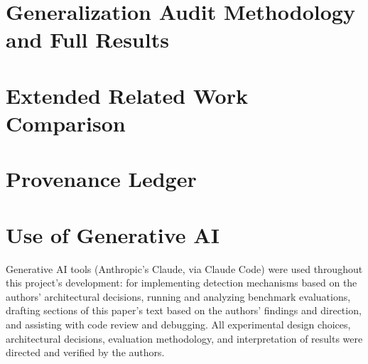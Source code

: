 \documentclass[sigconf,anonymous,review]{acmart}
\begin{document}
\appendix

\section{Generalization Audit Methodology and Full Results}
\label{sec:appendix-generalization}


\section{Extended Related Work Comparison}
\label{sec:appendix-related}

\FloatBarrier

\section{Provenance Ledger}
\label{sec:appendix-provenance}





\section*{Use of Generative AI}
Generative AI tools (Anthropic's Claude, via Claude Code) were used
throughout this project's development: for implementing detection
mechanisms based on the authors' architectural decisions, running and
analyzing benchmark evaluations, drafting sections of this paper's text
based on the authors' findings and direction, and assisting with code
review and debugging. All experimental design choices, architectural
decisions, evaluation methodology, and interpretation of results were
directed and verified by the authors.
\end{document}
